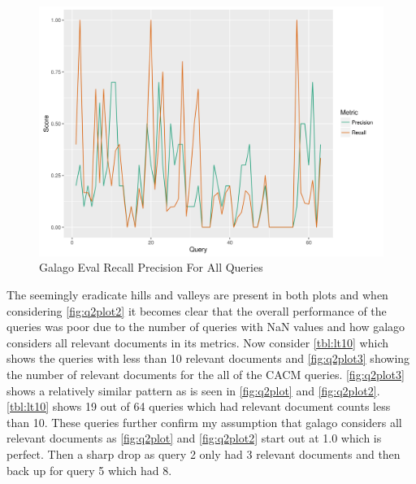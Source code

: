 \documentclass[11pt]{article}
\begin{document}
\begin{figure}[H]
\centering
\includegraphics[scale=0.9]{q2_plot_rp.png}
\caption{Galago Eval Recall Precision For All Queries}
\label{fig:q2plot2}
\end{figure}
The seemingly eradicate hills and valleys are present in both plots and when considering \autoref{fig:q2plot2} it becomes clear that the overall performance of the queries was poor due to the number of queries with NaN values and how galago considers all relevant documents in its metrics.  Now consider \autoref{tbl:lt10} which shows the queries with less than 10 relevant documents and \autoref{fig:q2plot3} showing the number of relevant documents for the all of the CACM queries. \autoref{fig:q2plot3} shows a relatively similar pattern as is seen in \autoref{fig:q2plot} and \autoref{fig:q2plot2}.  \autoref{tbl:lt10} shows 19 out of 64 queries which had relevant document counts less than 10. These queries further confirm my assumption that galago considers all relevant documents as  \autoref{fig:q2plot} and  \autoref{fig:q2plot2} start out at 1.0 which is perfect. Then a sharp drop as query 2 only had 3 relevant documents and then back up for query 5 which had 8.
\end{document}
